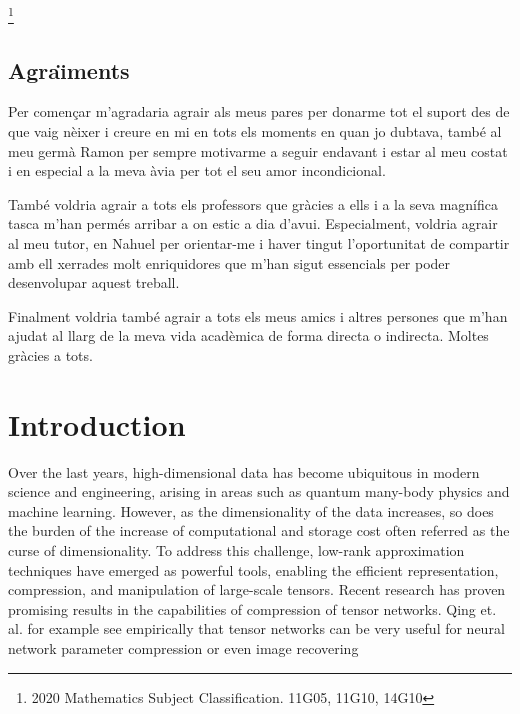 \documentclass[11pt,a4paper,openright,oneside]{book}
\numberwithin{equation}{section}
\begin{document}
{\let\thefootnote\relax\footnote{2020 Mathematics Subject Classification. 11G05, 11G10, 14G10}}



\newpage 


\section*{Agra\"{\i}ments}

Per començar m'agradaria agrair als meus pares per donarme tot el suport des de que vaig nèixer i creure
en mi en tots els moments en quan jo dubtava, també
al meu germà Ramon per sempre motivarme a seguir endavant i estar al meu costat i en especial a la meva àvia per tot el seu amor incondicional.

També voldria agrair a tots els professors que gràcies a ells i a la seva magnífica tasca
m'han permés arribar a on estic a dia d'avui. Especialment, voldria agrair al meu tutor, en Nahuel per orientar-me i haver tingut l'oportunitat de compartir amb ell xerrades molt enriquidores que m'han sigut 
essencials per poder desenvolupar aquest treball.

Finalment voldria també agrair a tots els meus amics i altres persones que m'han ajudat al llarg de la meva
vida acadèmica de forma directa o indirecta. Moltes gràcies a tots.
\newpage

{\hypersetup{linkcolor=black}
\tableofcontents
}

\newpage
\printglossary[title=Glossary]
\newpage
{} 
\setcounter{page}{1}
\chapter{Introduction}


Over the last years, high-dimensional data has become ubiquitous in modern science and engineering,
arising in areas such as quantum many-body physics and machine learning. However, as the dimensionality of the
data increases, so does the burden of the increase of computational and storage cost often referred
as the curse of dimensionality. To address this challenge, low-rank approximation techniques have emerged as powerful tools,
enabling the efficient representation, compression, and manipulation of large-scale tensors. Recent research 
has proven promising results in the capabilities of compression of
tensor networks. Qing et. al. for example see empirically that tensor networks can be very useful
for neural network parameter compression \cite{qingCompressingNeuralNetworks2025} or even image
recovering \cite{lyuMultiDimensionalImageRecovery2022}
\end{document}
